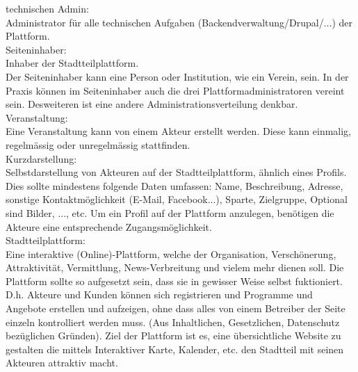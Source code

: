 \documentclass{swp}
\begin{document}
technischen Admin:\\Administrator f\"ur alle technischen Aufgaben (Backendverwaltung/Drupal/...) der Plattform.\\

Seiteninhaber:\\Inhaber der Stadtteilplattform.\\
Der Seiteninhaber kann eine Person oder Institution, wie ein Verein, sein. In der Praxis k\"onnen im Seiteninhaber auch die drei Plattformadministratoren vereint sein. Desweiteren ist eine andere Administrationsverteilung denkbar.\\

Veranstaltung:\\Eine Veranstaltung kann von einem Akteur erstellt werden. Diese kann einmalig, regelm\"a{ss}ig oder unregelm\"a{ss}ig stattfinden.\\

Kurzdarstellung: \\Selbstdarstellung von Akteuren auf der Stadtteilplattform, \"ahnlich eines Profils. Dies sollte mindestens folgende Daten umfassen: Name, Beschreibung, Adresse, sonstige Kontaktm\"oglichkeit (E-Mail, Facebook...), Sparte, Zielgruppe, Optional sind Bilder, ..., etc. Um ein Profil auf der Plattform anzulegen, ben\"otigen die Akteure eine entsprechende Zugangsm\"oglichkeit.\\

Stadtteilplattform: \\Eine interaktive (Online)-Plattform, welche der Organisation, Versch\"onerung, Attraktivit\"at, Vermittlung, \glqq News-Verbreitung\grqq{} und vielem mehr dienen soll. Die Plattform sollte so aufgesetzt sein, dass sie in gewisser Weise selbst fuktioniert. D.h. Akteure und Kunden k\"onnen sich registrieren und Programme und Angebote erstellen und aufzeigen, ohne dass alles von einem Betreiber der Seite einzeln kontrolliert werden muss. (Aus Inhaltlichen, Gesetzlichen, Datenschutz bez\"uglichen Gr\"unden). Ziel der Plattform ist es, eine \"ubersichtliche Website zu gestalten die mittels Interaktiver Karte, Kalender, etc. den Stadtteil mit seinen Akteuren attraktiv macht.
\end{document}
